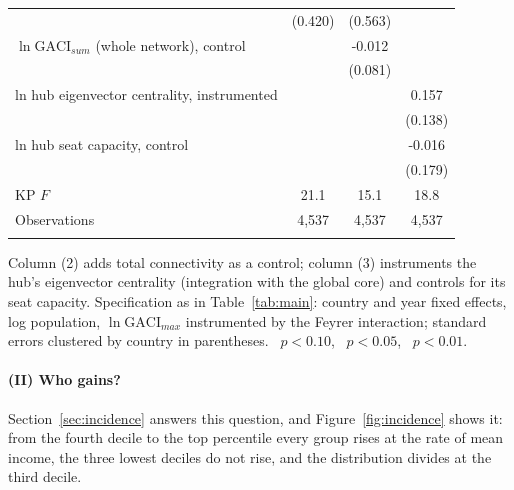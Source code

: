 \begin{table}[p]
\begin{threeparttable}
\begin{tabular}{lccc}
 & (0.420) & (0.563) &  \\
$\ln\mathrm{GACI}_{sum}$ (whole network), control &  & -0.012 &  \\
 &  & (0.081) &  \\
ln hub eigenvector centrality, instrumented &  &  & 0.157 \\
 &  &  & (0.138) \\
ln hub seat capacity, control &  &  & -0.016 \\
 &  &  & (0.179) \\
KP $F$ & 21.1 & 15.1 & 18.8 \\
Observations & 4{,}537 & 4{,}537 & 4{,}537 \\
\addlinespace
\bottomrule
\end{tabular}
\begin{tablenotes}\small
\item Column (2) adds total connectivity as a control; column (3) instruments the hub's eigenvector centrality (integration with the global core) and controls for its seat capacity. Specification as in Table~\ref{tab:main}: country and year fixed effects, log population, $\ln\mathrm{GACI}_{max}$ instrumented by the Feyrer interaction; standard errors clustered by country in parentheses. \sym{*}~$p<0.10$, \sym{**}~$p<0.05$, \sym{***}~$p<0.01$.
\end{tablenotes}
\end{threeparttable}
\end{table}


\paragraph{(II) Who gains?}
Section~\ref{sec:incidence} answers this question, and Figure~\ref{fig:incidence} shows it: from the fourth decile to the top percentile every group rises at the rate of mean income, the three lowest deciles do not rise, and the distribution divides at the third decile.

